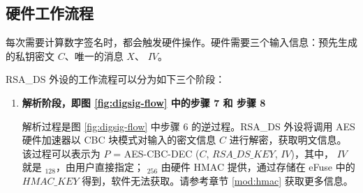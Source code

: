 \documentclass[main\_\_CN.tex]{subfiles}
\begin{document}
\subsection{硬件工作流程}
\label{sec:digsig-hardware-level-operation}

每次需要计算数字签名时，都会触发硬件操作。硬件需要三个输入信息：预先生成的私钥密文 \begin{math}C\end{math}、唯一的消息 \begin{math}X\end{math}、 \begin{math}IV\end{math}。

RSA\_DS 外设的工作流程可以分为如下三个阶段：

\begin{enumerate}  

    \item {\bfseries 解析阶段，即图 \ref{fig:digsig-flow} 中的步骤 7 和 步骤 8}
    
        解析过程是图 \ref{fig:digsig-flow} 中步骤 6 的逆过程。RSA\_DS 外设将调用 AES 硬件加速器以 CBC 块模式对输入的密文信息 \begin{math}C\end{math} 进行解密，获取明文信息。
        该过程可以表示为
        \begin{math}P\end{math} = AES-CBC-DEC (\begin{math}C\end{math}, \begin{math}RSA\_DS\_KEY\end{math}, \begin{math}IV\end{math})，其中， \begin{math}IV\end{math} 就是 \begin{math}[IV]_{128}\end{math}，由用户直接指定； \begin{math}[RSA\_DS\_KEY]_{256}\end{math} 由硬件 HMAC 提供，通过存储在 eFuse 中的 \begin{math}HMAC\_KEY\end{math} 得到，软件无法获取。请参考章节 \ref{mod:hmac} \textit{} 获取更多信息。
        

\end{enumerate}
\end{document}
